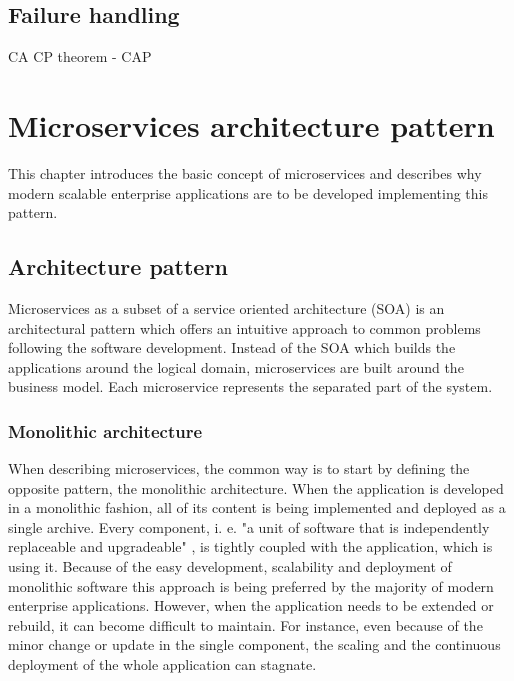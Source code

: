 \documentclass[oneside,
  digital, %
  table,   %
  nolof,     %
  nolot,     %
]{fithesis3}
\begin{document}
\section{Failure handling}





CA CP theorem - CAP



\clearpage
\chapter{Microservices architecture pattern}

This chapter introduces the basic concept of microservices and describes why modern scalable enterprise applications are to be developed implementing this pattern.

\section{Architecture pattern}

Microservices as a subset of a service oriented architecture (SOA) \cite{soa} is an architectural pattern which offers an intuitive approach to common problems following the software development. Instead of the SOA which builds the applications around the logical domain, microservices are built around the business model. Each microservice represents the separated part of the system.

\subsection{Monolithic architecture}

When describing microservices, the common way is to start by defining the opposite pattern, the monolithic architecture. When the application is developed in a monolithic fashion, all of its content is being implemented and deployed as a single archive. Every component, i. e. "a unit of software that is independently replaceable and upgradeable" \cite{microservices}, is tightly coupled with the application, which is using it. Because of the easy development, scalability and deployment of monolithic software this approach is being preferred by the majority of modern enterprise applications. However, when the application needs to be extended or rebuild, it can become difficult to maintain. For instance, even because of the minor change or update in the single component, the scaling and the continuous deployment of the whole application can stagnate. 
\end{document}
